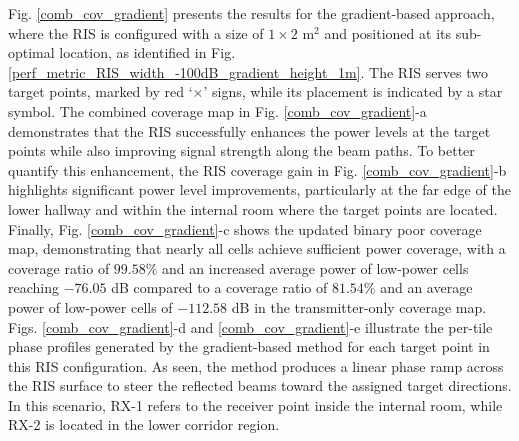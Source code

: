 \documentclass{IEEEoj}
\begin{document}
Fig. \ref{comb_cov_gradient} presents the results for the gradient-based approach, where the RIS is configured with a size of $1 \times 2$ m$^2$ and positioned at its sub-optimal location, as identified in Fig. \ref{perf_metric_RIS_width_-100dB_gradient_height_1m}. The RIS serves two target points, marked by red `$\times$' signs, while its placement is indicated by a star symbol. The combined coverage map in Fig. \ref{comb_cov_gradient}-a demonstrates that the RIS successfully enhances the power levels at the target points while also improving signal strength along the beam paths. To better quantify this enhancement, the RIS coverage gain in Fig. \ref{comb_cov_gradient}-b highlights significant power level improvements, particularly at the far edge of the lower hallway and within the internal room where the target points are located. Finally, Fig. \ref{comb_cov_gradient}-c shows the updated binary poor coverage map, demonstrating that nearly all cells achieve sufficient power coverage, with a coverage ratio of $99.58\%$ and an increased average power of low-power cells reaching $-76.05$ dB compared to a coverage ratio of $81.54\%$ and an average power of low-power cells of $-112.58$ dB in the transmitter-only coverage map. Figs. \ref{comb_cov_gradient}-d and \ref{comb_cov_gradient}-e illustrate the per-tile phase profiles generated by the gradient-based method for each target point in this RIS configuration. As seen, the method produces a linear phase ramp across the RIS surface to steer the reflected beams toward the assigned target directions. In this scenario, RX-1 refers to the receiver point inside the internal room, while RX-2 is located in the lower corridor region.
\end{document}
